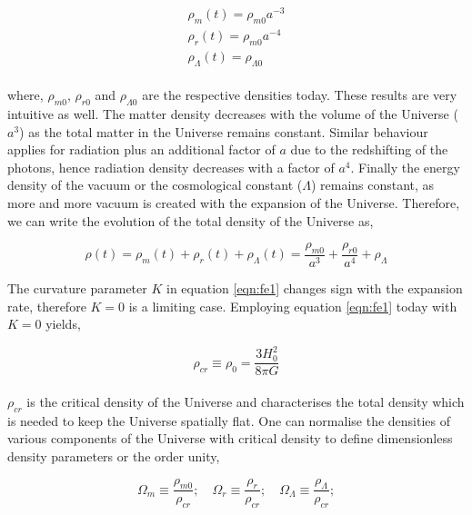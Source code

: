\begin{equation}
\begin{array}{l}
\rho_m(t) = \rho_{m0} a^{-3} \\
\rho_r(t) = \rho_{m0} a^{-4} \\
\rho_{\Lambda}(t) = \rho_{\Lambda 0}

\end{array} 
\label{eq:xdef}
\end{equation}
\\ 
where, $\rho_{m0}$, $\rho_{r0}$ and $\rho_{\Lambda 0}$ are the respective densities
today. These results are very intuitive as well. The matter density decreases with the volume 
of the Universe ($a^3$) as the total matter in the Universe remains constant. Similar
behaviour applies for radiation plus an additional factor of $a$ due to the redshifting
of the photons, hence radiation density decreases with a factor of $a^4$. Finally the
energy density of the vacuum or the cosmological constant ($\Lambda$) remains constant, 
as more and more vacuum is created with the expansion of the Universe. Therefore,
we can write the evolution of the total density of the Universe as,

\begin{equation}
	\rho(t) = \rho_m(t)+\rho_r(t)+\rho_{\Lambda}(t) = \dfrac{\rho_{m0}}{a^3} + \dfrac{\rho_{r0}}{a^4} + \rho_{\Lambda}
	\label{eqn:dens}
\end{equation}



The curvature parameter $K$ in equation \ref{eqn:fe1} changes sign with the expansion 
rate, therefore $K=0$ is a limiting case. Employing equation \ref{eqn:fe1} today with
$K=0$ yields,

\begin{equation}
	\rho_{cr} \equiv \rho_0 = \dfrac{3H_0^2}{8\pi G}
\end{equation}
\\
$\rho_{cr}$ is the critical density of the Universe and characterises the total density
which is needed to keep the Universe spatially flat. One can normalise the densities of
various components of the Universe with critical density to define dimensionless density
parameters or the order unity,

\begin{equation}
	\Omega_m \equiv \dfrac{\rho_{m0}}{\rho_{cr}};\quad
	\Omega_r \equiv \dfrac{\rho_{r}}{\rho_{cr}};\quad
	\Omega_{\Lambda} \equiv \dfrac{\rho_{\Lambda}}{\rho_{cr}};
	\label{eqn:Omega}
\end{equation}

